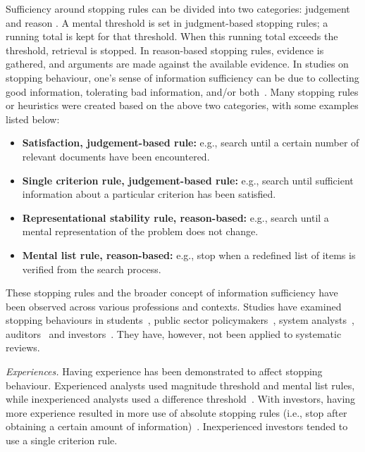\documentclass[10pt,oneside]{book}
\begin{document}
Sufficiency around stopping rules can be divided into two categories: judgement and reason \cite{nickles_judgment-based_1995, maxwell_modelling_2021}. A mental threshold is set in judgment-based stopping rules; a running total is kept for that threshold. When this running total exceeds the threshold, retrieval is stopped. In reason-based stopping rules, evidence is gathered, and arguments are made against the available evidence. In studies on stopping behaviour, one’s sense of information sufficiency can be due to collecting good information, tolerating bad information, and/or both~\cite{wu_how_2013}. Many stopping rules or heuristics were created based on the above two categories, with some examples listed below:

\begin{itemize}
    \item \textbf{Satisfaction, judgement-based rule:} e.g., search until a certain number of relevant documents have been encountered.
    \item \textbf{Single criterion rule, judgement-based rule:} e.g., search until sufficient information about a particular criterion has been satisfied.
    \item \textbf{Representational stability rule, reason-based:} e.g., search until a mental representation of the problem does not change.
    \item \textbf{Mental list rule, reason-based:} e.g., stop when a redefined list of items is verified from the search process.
\end{itemize}

These stopping rules and the broader concept of information sufficiency have been observed across various professions and contexts. Studies have examined stopping behaviours in students~\cite{browne_stopping_2005, browne_cognitive_2007, dedema_examination_2019, nickles_judgment-based_1995, creighton_university_cognitive_2017, gerhart_generalizing_2020}, public sector policymakers~\cite{berryman_what_2006}, system analysts~\cite{pitts_stopping_2004}, auditors~\cite{poziemski_when_2019} 
and investors~\cite{pennington_how_2016}. They have, however, not been applied to systematic reviews. 

\emph{Experiences.} Having experience has been demonstrated to affect stopping behaviour. Experienced analysts used magnitude threshold and mental list rules, while inexperienced analysts used a difference threshold~\cite{pitts_stopping_2004}. With investors, having more experience resulted in more use of absolute stopping rules (i.e., stop after obtaining a certain amount of information)~\cite{pennington_how_2016}. Inexperienced investors tended to use a single criterion rule.
\end{document}
